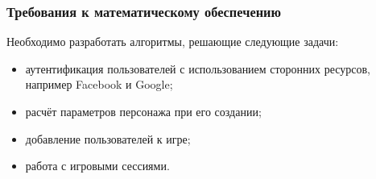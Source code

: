 \subsubsection{Требования к математическому обеспечению}

Необходимо разработать алгоритмы, решающие следующие задачи:

\begin{itemize}
\item аутентификация пользователей с использованием сторонних ресурсов, например Facebook и Google;
\item расчёт параметров персонажа при его создании;
\item добавление пользователей к игре;
\item работа с игровыми сессиями.
\end{itemize}
